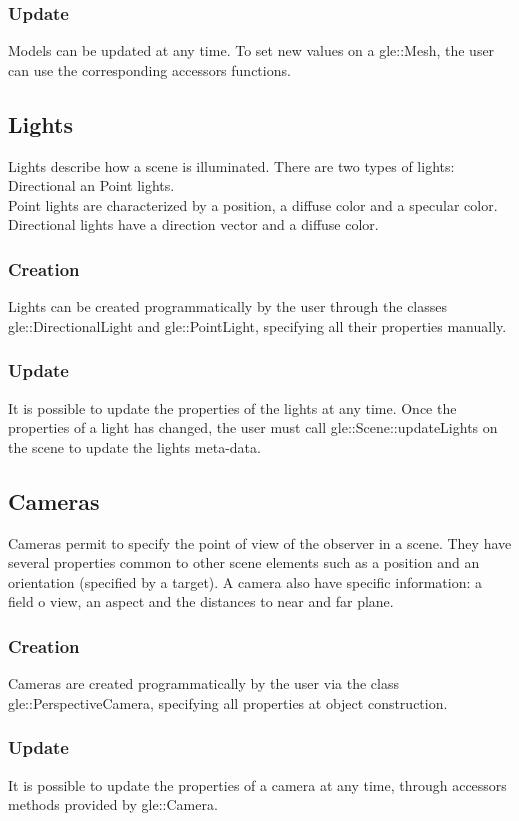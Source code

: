 \documentclass [a4 paper,11pt]{article}
\begin{document}
\subsubsection{Update}
Models can be updated at any time. To set new values on a gle::Mesh, the user can use the corresponding accessors functions.

\subsection{Lights}
Lights describe how a scene is illuminated. There are two types of lights: Directional an Point lights.\\
Point lights are characterized by a position, a diffuse color and a specular color. Directional lights have a direction vector and a diffuse color.
\subsubsection{Creation}
Lights can be created programmatically by the user through the classes gle::DirectionalLight and gle::PointLight, specifying all their properties manually.
\subsubsection{Update}
It is possible to update the properties of the lights at any time. Once the properties of a light has changed, the user must call gle::Scene::updateLights on the scene to update the lights meta-data.

\subsection{Cameras}
Cameras permit to specify the point of view of the observer in a scene. They have several properties common to other scene elements such as a position and an orientation (specified by a target). A camera also have specific information: a field o view, an aspect and the distances to near and far plane.
\subsubsection{Creation}
Cameras are created programmatically by the user via the class gle::PerspectiveCamera, specifying all properties at object construction.
\subsubsection{Update}
It is possible to update the properties of a camera at any time, through accessors methods provided by gle::Camera.
\end{document}
